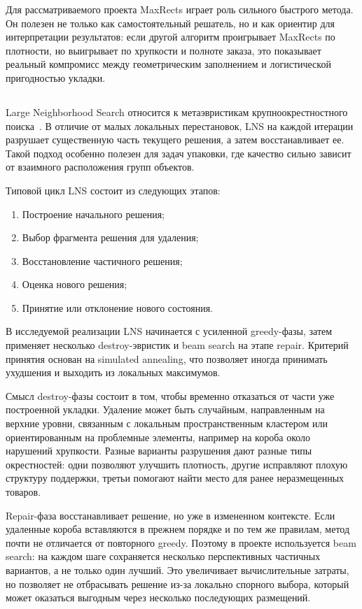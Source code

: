 Для рассматриваемого проекта MaxRects играет роль сильного быстрого метода. Он полезен не только как самостоятельный решатель, но и как ориентир для интерпретации результатов: если другой алгоритм проигрывает MaxRects по плотности, но выигрывает по хрупкости и полноте заказа, это показывает реальный компромисс между геометрическим заполнением и логистической пригодностью укладки.

\subsection{}

Large Neighborhood Search относится к метаэвристикам крупноокрестностного поиска~\cite{pisinger2010}. В отличие от малых локальных перестановок, LNS на каждой итерации разрушает существенную часть текущего решения, а затем восстанавливает ее. Такой подход особенно полезен для задач упаковки, где качество сильно зависит от взаимного расположения групп объектов.

Типовой цикл LNS состоит из следующих этапов:
\begin{enumerate}
  \item Построение начального решения;
  \item Выбор фрагмента решения для удаления;
  \item Восстановление частичного решения;
  \item Оценка нового решения;
  \item Принятие или отклонение нового состояния.
\end{enumerate}

В исследуемой реализации LNS начинается с усиленной greedy-фазы, затем применяет несколько destroy-эвристик и beam search на этапе repair. Критерий принятия основан на simulated annealing, что позволяет иногда принимать ухудшения и выходить из локальных максимумов.

Смысл destroy-фазы состоит в том, чтобы временно отказаться от части уже построенной укладки. Удаление может быть случайным, направленным на верхние уровни, связанным с локальным пространственным кластером или ориентированным на проблемные элементы, например на короба около нарушений хрупкости. Разные варианты разрушения дают разные типы окрестностей: одни позволяют улучшить плотность, другие исправляют плохую структуру поддержки, третьи помогают найти место для ранее неразмещенных товаров.

Repair-фаза восстанавливает решение, но уже в измененном контексте. Если удаленные короба вставляются в прежнем порядке и по тем же правилам, метод почти не отличается от повторного greedy. Поэтому в проекте используется beam search: на каждом шаге сохраняется несколько перспективных частичных вариантов, а не только один лучший. Это увеличивает вычислительные затраты, но позволяет не отбрасывать решение из-за локально спорного выбора, который может оказаться выгодным через несколько последующих размещений.

